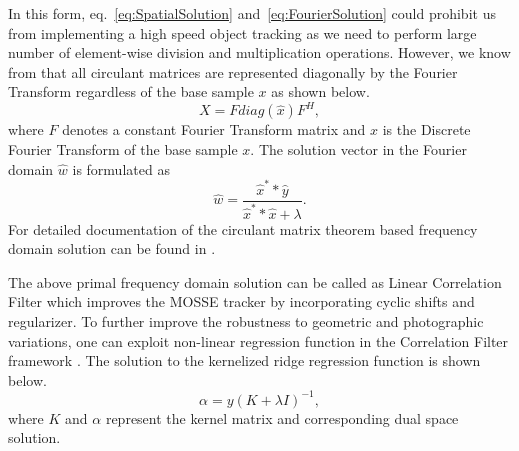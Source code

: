 \documentclass{bmvc2k}
\begin{document}

In this form, eq.~\ref{eq:SpatialSolution}
and~\ref{eq:FourierSolution} could prohibit us from implementing a
high speed object tracking as we need to perform large number of
element-wise division and multiplication operations. However, we know
from \cite{gray2006toeplitz} that all circulant matrices are
represented diagonally by the Fourier Transform regardless of the base
sample $x$ as shown below.
\begin{equation}
X = Fdiag(\hat{x})F^{H},
\label{eq:CirculantMatrixDFT}
\end{equation}
where $F$ denotes a constant Fourier Transform matrix and $x$ is the
Discrete Fourier Transform of the base sample $x$. 
The solution vector in the Fourier domain $\hat{w}$ is formulated as
\begin{equation}
\hat{w} = \dfrac{\hat{x}^{*}*\hat{y}}{\hat{x}^{*}*\hat{x}+\lambda}.
\label{eq:DiagonalizedPrimalSolution}
\end{equation}
For detailed documentation of the circulant matrix theorem based
frequency domain solution can be found in
\cite{henriques2012exploiting,henriques2015high}.

The above primal frequency domain solution can be called as Linear
Correlation Filter which improves the MOSSE tracker by incorporating
cyclic shifts and regularizer. To further improve the robustness to
geometric and photographic variations, one can exploit non-linear
regression function in the Correlation Filter framework
\cite{henriques2015high}. The solution to the kernelized ridge
regression function is shown below.
\begin{equation}
\alpha = y(K+\lambda I)^{-1},
\end{equation}
where $K$ and $\alpha$ represent the kernel matrix and corresponding
dual space solution. 
\end{document}
